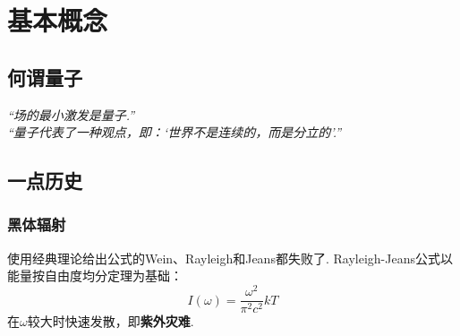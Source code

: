 \chapter{基本概念}
\section{何谓量子}
\begin{center}
    \itshape
    “场的最小激发是量子.” \\
    “量子代表了一种观点，即：‘世界不是连续的，而是分立的’.”
\end{center}

\section{一点历史}
\subsection{黑体辐射}
使用经典理论给出公式的Wein、Rayleigh和Jeans都失败了.
Rayleigh-Jeans公式以能量按自由度均分定理为基础：
\begin{equation}
    I(\omega) = \dfrac{\omega^2}{\pi^2 c^2}kT
\end{equation}
在$\omega$较大时快速发散，即\textcolor{PurpleDeep}{\textbf{紫外灾难}}.

